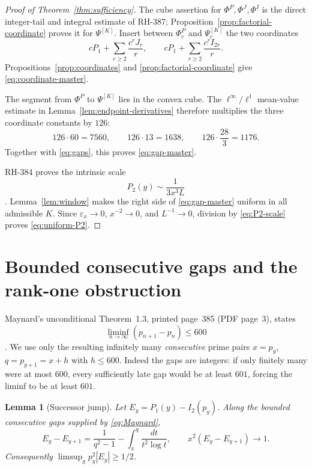 \documentclass[11pt]{article}
\newtheorem{lemma}[theorem]{Lemma}
\theoremstyle{definition}
\theoremstyle{remark}
\newcommand{\eps}{\varepsilon}
\newcommand{\PhiP}{\Phi^{P}}
\newcommand{\PhiJ}{\Phi^{J}}
\newcommand{\PhiI}{\Phi^{I}}
\newcommand{\PsiK}{\Psi^{[K]}}
\begin{document}
\begin{proof}[Proof of Theorem~\ref{thm:sufficiency}]
The cube assertion for $\PhiP,\PhiJ,\PhiI$ is the direct integer-tail and
integral estimate of RH-387; Proposition~\ref{prop:factorial-coordinate}
proves it for $\PsiK$.  Insert between $\PhiP_c$ and $\PsiK_c$ the two
coordinates
\[
 cP_1+\sum_{r\ge2}\frac{c^rJ_r}{r},
 \qquad
 cP_1+\sum_{r\ge2}\frac{c^rI_{2r}}{r}.
\]
Propositions~\ref{prop:coordinates} and
\ref{prop:factorial-coordinate} give \eqref{eq:coordinate-master}.

The segment from $\PhiP$ to $\PsiK$ lies in the convex cube.  The
$\ell^\infty/\ell^1$ mean-value estimate in
Lemma~\ref{lem:endpoint-derivatives} therefore multiplies the three
coordinate constants by $126$:
\[
 126\cdot60=7560,\qquad
 126\cdot13=1638,\qquad
 126\cdot\frac{28}{3}=1176.
\]
Together with \eqref{eq:gaps}, this proves \eqref{eq:gap-master}.

RH-384 proves the intrinsic scale
\begin{equation}
 P_2(y)\sim\frac1{3x^3L}
 \label{eq:P2-scale}
\end{equation}
\cite{RH384}.  Lemma~\ref{lem:window} makes the right side of
\eqref{eq:gap-master} uniform in all admissible $K$.  Since
$\eps_x\to0$, $x^{-2}\to0$, and $L^{-1}\to0$, division by
\eqref{eq:P2-scale} proves \eqref{eq:uniform-P2}.
\end{proof}

\section{Bounded consecutive gaps and the rank-one obstruction}

Maynard's unconditional Theorem~1.3, printed page~385 (PDF page~3),
states
\begin{equation}
 \liminf_{n\to\infty}(p_{n+1}-p_n)\le600
 \label{eq:Maynard}
\end{equation}
\cite{Maynard2015}.  We use only the resulting infinitely many
\emph{consecutive} prime pairs $x=p_y$, $q=p_{y+1}=x+h$ with
$h\le600$.  Indeed the gaps are integers: if only finitely many were at
most $600$, every sufficiently late gap would be at least $601$, forcing
the liminf to be at least $601$.

\begin{lemma}[Successor jump]
\label{lem:jump}
Let $E_y=P_1(y)-I_2(p_y)$.  Along the bounded consecutive gaps supplied
by \eqref{eq:Maynard},
\begin{equation}
 E_y-E_{y+1}=\frac1{q^2-1}
 -\int_x^q\frac{dt}{t^2\log t},
 \qquad x^2(E_y-E_{y+1})\longrightarrow1.
 \label{eq:E-jump}
\end{equation}
Consequently $\limsup_y p_y^2|E_y|\ge1/2$.
\end{lemma}
\end{document}

